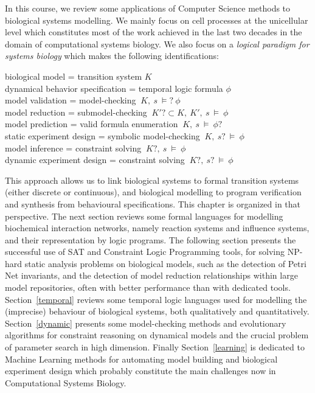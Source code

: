 \documentclass[graybox]{svmult}
\begin{document}
In this course,  we review some applications of Computer Science methods to biological systems modelling.
We mainly focus on cell processes at the unicellular level
which constitutes most of the work achieved in the last two decades in the domain of computational systems biology.
We also focus on a \emph{logical paradigm for systems biology} which makes the following identifications:
\begin{center}
  biological model = transition system $K$\\
  dynamical behavior specification = temporal logic formula $\phi$\\
  model validation = model-checking $\ K,\ s\ \models?\ \phi$\\
  model reduction = submodel-checking $\ K'?\subset K,\ K',\ s\ \models\ \phi$\\
  model prediction = valid formula enumeration $\ K,\ s\ \models\ \phi?$\\
  static experiment design = symbolic model-checking $\ K,\ s?\ \models\ \phi$\\
  model inference = constraint solving $\ K?,\ s\ \models\ \phi$\\
  dynamic experiment design = constraint solving $\ K?,\ s?\ \models\ \phi$\\
\end{center}

This approach allows us to link biological systems to formal transition systems (either discrete or continuous),
and biological modelling to program verification and synthesis from behavioural specifications.
This chapter is organized in that perspective.
The next section reviews some formal languages for modelling biochemical interaction networks,
namely reaction systems and influence systems,
and their representation by logic programs. %
The following section presents the successful use of SAT and Constraint Logic Programming tools,
for solving NP-hard static analysis problems on biological models, such as the detection of Petri Net invariants,
and the detection of model reduction relationships within large model repositories,
often with better performance than with dedicated tools.
Section~\ref{temporal} reviews  some temporal logic languages used for modelling the (imprecise) behaviour of biological systems,
both qualitatively and quantitatively.
Section~\ref{dynamic} presents some model-checking methods and evolutionary algorithms for constraint reasoning on dynamical models and
the crucial problem of parameter search in high dimension.
Finally Section~\ref{learning} is dedicated to Machine Learning methods for automating model building 
and biological experiment design which probably constitute the main challenges now in Computational Systems Biology.
\end{document}

